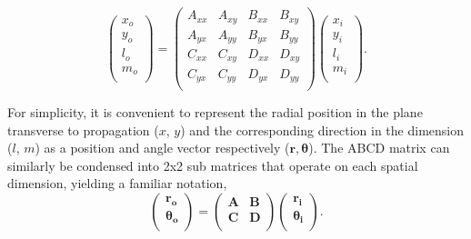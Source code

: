 \begin{equation}
    \begin{pmatrix}
    x_o \\
    y_o \\
    l_o \\
    m_o \\
    \end{pmatrix}
    = 
    \begin{pmatrix}
    A_{xx} & A_{xy} & B_{xx} & B_{xy} \\
    A_{yx} & A_{yy} & B_{yx} & B_{yy} \\
    C_{xx} & C_{xy} & D_{xx} & D_{xy} \\
    C_{yx} & C_{yy} & D_{yx} & D_{yy} \\
    \end{pmatrix}
    \begin{pmatrix}
    x_i \\
    y_i \\
    l_i \\
    m_i \\
    \end{pmatrix}.
    \label{eq:totalabcdmatrix}
\end{equation}

For simplicity, it is convenient to represent the radial position in the plane transverse to propagation ($x$, $y$) and the corresponding direction in the dimension ($l$, $m$) as a position and angle vector respectively ($\mathbf{r}, \boldsymbol{\theta}$). The ABCD matrix can similarly be condensed into 2x2 sub matrices that operate on each spatial dimension, yielding a familiar notation,
\begin{equation}
    \begin{pmatrix}
    \mathbf{r_{o}} \\
    \boldsymbol{\theta_{o}} \\
    \end{pmatrix}
    =
    \begin{pmatrix}
    \mathbf{A} & \mathbf{B} \\
    \mathbf{C} & \mathbf{D} \\
    \end{pmatrix}
    \begin{pmatrix}
    \mathbf{r_{i}} \\
    \boldsymbol{\theta_{i}} \\
    \end{pmatrix}
    \label{eq:matrixabcd}.
\end{equation}

